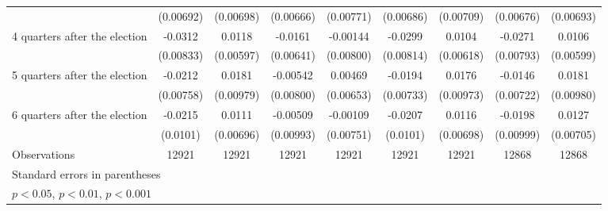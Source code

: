 \begin{table}[htbp]
\begin{tabular}{l*{8}{c}}
                    &   (0.00692)         &   (0.00698)         &   (0.00666)         &   (0.00771)         &   (0.00686)         &   (0.00709)         &   (0.00676)         &   (0.00693)         \\
[1em]
 4 quarters after the election&     -0.0312\sym{***}&      0.0118\sym{*}  &     -0.0161\sym{*}  &    -0.00144         &     -0.0299\sym{***}&      0.0104         &     -0.0271\sym{***}&      0.0106         \\
                    &   (0.00833)         &   (0.00597)         &   (0.00641)         &   (0.00800)         &   (0.00814)         &   (0.00618)         &   (0.00793)         &   (0.00599)         \\
[1em]
 5 quarters after the election&     -0.0212\sym{**} &      0.0181         &    -0.00542         &     0.00469         &     -0.0194\sym{**} &      0.0176         &     -0.0146\sym{*}  &      0.0181         \\
                    &   (0.00758)         &   (0.00979)         &   (0.00800)         &   (0.00653)         &   (0.00733)         &   (0.00973)         &   (0.00722)         &   (0.00980)         \\
[1em]
 6 quarters after the election&     -0.0215\sym{*}  &      0.0111         &    -0.00509         &    -0.00109         &     -0.0207\sym{*}  &      0.0116         &     -0.0198\sym{*}  &      0.0127         \\
                    &    (0.0101)         &   (0.00696)         &   (0.00993)         &   (0.00751)         &    (0.0101)         &   (0.00698)         &   (0.00999)         &   (0.00705)         \\
\hline
Observations        &       12921         &       12921         &       12921         &       12921         &       12921         &       12921         &       12868         &       12868         \\
\hline\hline
\multicolumn{9}{l}{\footnotesize Standard errors in parentheses}\\
\multicolumn{9}{l}{\footnotesize \sym{*} \(p<0.05\), \sym{**} \(p<0.01\), \sym{***} \(p<0.001\)}\\
\end{tabular}
\end{table}
